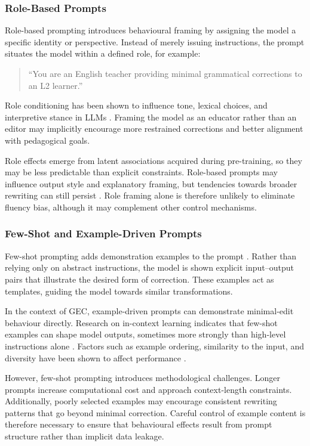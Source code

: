 \subsubsection{Role-Based Prompts}

Role-based prompting introduces behavioural framing by assigning the model a specific identity or perspective. Instead of merely issuing instructions, the prompt situates the model within a defined role, for example:

\begin{quote}
``You are an English teacher providing minimal grammatical corrections to an L2 learner.''
\end{quote}

Role conditioning has been shown to influence tone, lexical choices, and interpretive stance in LLMs \cite{wei2022finetuned,liu2023pretrain}. Framing the model as an educator rather than an editor may implicitly encourage more restrained corrections and better alignment with pedagogical goals.

Role effects emerge from latent associations acquired during pre-training, so they may be less predictable than explicit constraints. Role-based prompts may influence output style and explanatory framing, but tendencies towards broader rewriting can still persist \cite{NEURIPS2020_1457c0d6}. Role framing alone is therefore unlikely to eliminate fluency bias, although it may complement other control mechanisms.

\subsubsection{Few-Shot and Example-Driven Prompts}

Few-shot prompting adds demonstration examples to the prompt \cite{NEURIPS2020_1457c0d6}. Rather than relying only on abstract instructions, the model is shown explicit input--output pairs that illustrate the desired form of correction. These examples act as templates, guiding the model towards similar transformations.

In the context of GEC, example-driven prompts can demonstrate minimal-edit behaviour directly. Research on in-context learning indicates that few-shot examples can shape model outputs, sometimes more strongly than high-level instructions alone \cite{liu2023pretrain}. Factors such as example ordering, similarity to the input, and diversity have been shown to affect performance \cite{wei2022finetuned}.

However, few-shot prompting introduces methodological challenges. Longer prompts increase computational cost and approach context-length constraints. Additionally, poorly selected examples may encourage consistent rewriting patterns that go beyond minimal correction. Careful control of example content is therefore necessary to ensure that behavioural effects result from prompt structure rather than implicit data leakage.

